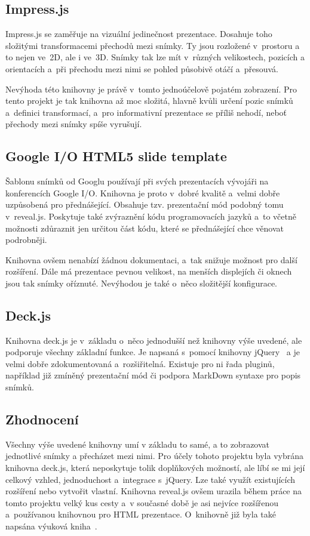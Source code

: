 \documentclass[11pt,twoside,a4paper]{book}
\begin{document}
\subsection{Impress.js}
Impress.js \cite{impressjs} se zaměřuje na vizuální jedinečnost prezentace. Dosahuje toho složitými transformacemi přechodů mezi snímky. Ty jsou rozložené v~prostoru a to nejen ve~2D, ale i ve~3D. Snímky tak lze mít v~různých velikostech, pozicích a orientacích a~při přechodu mezi nimi se pohled působivě otáčí a~přesouvá.

Nevýhoda této knihovny je právě v~tomto jednoúčelově pojatém zobrazení. Pro tento projekt je tak knihovna až moc složitá, hlavně kvůli určení pozic snímků a~definici transformací, a~pro informativní prezentace se příliš nehodí, neboť přechody mezi snímky spíše vyrušují.

\subsection{Google I/O HTML5 slide template}
Šablonu snímků od Googlu \cite{googletemplate} používají při svých prezentacích vývojáři na konferencích Google I/O. Knihovna je proto v~dobré kvalitě a~velmi dobře uzpůsobená pro přednášející. Obsahuje tzv. prezentační mód podobný tomu v~reveal.js. Poskytuje také zvýraznění kódu programovacích jazyků a~to včetně možnosti zdůraznit jen určitou část kódu, které se přednášející chce věnovat podrobněji.

Knihovna ovšem nenabízí žádnou dokumentaci, a~tak snižuje možnost pro další rozšíření. Dále má prezentace pevnou velikost, na menších displejích či oknech jsou tak snímky oříznuté. Nevýhodou je také o~něco složitější konfigurace.

\subsection{Deck.js}
Knihovna deck.js \cite{deckjs} je v~základu o~něco jednodušší než knihovny výše uvedené, ale podporuje všechny základní funkce. Je napsaná s~pomocí knihovny jQuery~\cite{jQuery} a je velmi dobře zdokumentovaná a~rozšiřitelná. Existuje pro ni řada pluginů, například již zmíněný prezentační mód či podpora Mark\-Down syntaxe pro popis snímků.

\subsection{Zhodnocení}
Všechny výše uvedené knihovny umí v základu to samé, a to zobrazovat jednotlivé snímky a přecházet mezi nimi. Pro účely tohoto projektu byla vybrána knihovna deck.js, která neposkytuje tolik doplňkových možností, ale líbí se mi její celkový vzhled, jednoduchost a~integrace s~jQuery. Lze také využít existujících rozšíření nebo vytvořit vlastní. Knihovna reveal.js ovšem urazila během práce na tomto projektu velký kus cesty a~v současné době je asi nejvíce rozšířenou a~používanou knihovnou pro HTML prezentace. O~knihovně již byla také napsána výuková kniha~\cite{howtobook}.
\end{document}
